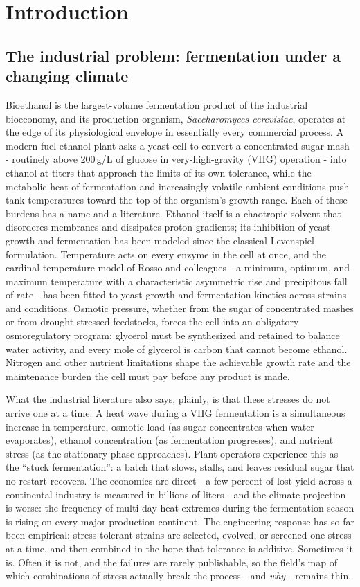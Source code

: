 \documentclass[12pt]{article}
\begin{document}
\section{Introduction}
\label{sec:intro}

\subsection{The industrial problem: fermentation under a changing climate}

Bioethanol is the largest-volume fermentation product of the industrial
bioeconomy, and its production organism, \emph{Saccharomyces cerevisiae},
operates at the edge of its physiological envelope in essentially every
commercial process. A modern fuel-ethanol plant asks a yeast cell to
convert a concentrated sugar mash - routinely above 200\,g/L of glucose in
very-high-gravity (VHG) operation - into ethanol at titers that approach
the limits of its own tolerance, while the metabolic heat of fermentation
and increasingly volatile ambient conditions push tank temperatures toward
the top of the organism's growth range. Each of these burdens has a name
and a literature. Ethanol itself is a chaotropic solvent that disorderes
membranes and dissipates proton gradients; its inhibition of yeast growth
and fermentation has been modeled since the classical Levenspiel
formulation. Temperature acts on every enzyme in the cell at once, and the
cardinal-temperature model of Rosso and colleagues - a minimum, optimum,
and maximum temperature with a characteristic asymmetric rise and
precipitous fall of rate - has been fitted to yeast growth and
fermentation kinetics across strains and conditions. Osmotic pressure,
whether from the sugar of concentrated mashes or from drought-stressed
feedstocks, forces the cell into an obligatory osmoregulatory program:
glycerol must be synthesized and retained to balance water activity, and
every mole of glycerol is carbon that cannot become ethanol. Nitrogen and
other nutrient limitations shape the achievable growth rate and the
maintenance burden the cell must pay before any product is made.

What the industrial literature also says, plainly, is that these stresses
do not arrive one at a time. A heat wave during a VHG fermentation is a
simultaneous increase in temperature, osmotic load (as sugar concentrates
when water evaporates), ethanol concentration (as fermentation
progresses), and nutrient stress (as the stationary phase approaches).
Plant operators experience this as the ``stuck fermentation'': a batch
that slows, stalls, and leaves residual sugar that no restart recovers.
The economics are direct - a few percent of lost yield across a
continental industry is measured in billions of liters - and the climate
projection is worse: the frequency of multi-day heat extremes during the
fermentation season is rising on every major production continent. The
engineering response has so far been empirical: stress-tolerant strains
are selected, evolved, or screened one stress at a time, and then combined
in the hope that tolerance is additive. Sometimes it is. Often it is not,
and the failures are rarely publishable, so the field's map of which
combinations of stress actually break the process - and \emph{why} -
remains thin.
\end{document}
